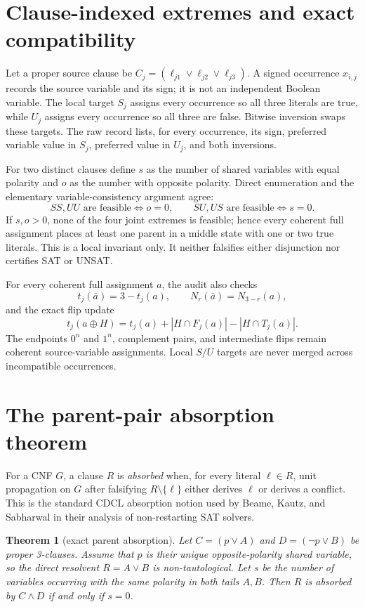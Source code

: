 \documentclass[11pt]{article}
\newtheorem{theorem}{Theorem}
\begin{document}
\section{Clause-indexed extremes and exact compatibility}
Let a proper source clause be $C_j=(\ell_{j1}\vee\ell_{j2}\vee\ell_{j3})$.  A signed occurrence $x_{i,j}$ records the source variable and its sign; it is not an independent Boolean variable.  The local target $S_j$ assigns every occurrence so all three literals are true, while $U_j$ assigns every occurrence so all three are false.  Bitwise inversion swaps these targets.  The raw record lists, for every occurrence, its sign, preferred variable value in $S_j$, preferred value in $U_j$, and both inversions.

For two distinct clauses define $s$ as the number of shared variables with equal polarity and $o$ as the number with opposite polarity.  Direct enumeration and the elementary variable-consistency argument agree:
\[
 SS,UU\text{ are feasible}\iff o=0,
 \qquad
 SU,US\text{ are feasible}\iff s=0.
\]
If $s,o>0$, none of the four joint extremes is feasible; hence every coherent full assignment places at least one parent in a middle state with one or two true literals.  This is a local invariant only.  It neither falsifies either disjunction nor certifies SAT or UNSAT.

For every coherent full assignment $a$, the audit also checks
\[
 t_j(\bar a)=3-t_j(a),\qquad N_r(\bar a)=N_{3-r}(a),
\]
and the exact flip update
\[
 t_j(a\oplus H)=t_j(a)+|H\cap F_j(a)|-|H\cap T_j(a)|.
\]
The endpoints $0^n$ and $1^n$, complement pairs, and intermediate flips remain coherent source-variable assignments.  Local $S/U$ targets are never merged across incompatible occurrences.

\section{The parent-pair absorption theorem}
For a CNF $G$, a clause $R$ is \emph{absorbed} when, for every literal $\ell\in R$, unit propagation on $G$ after falsifying $R\setminus\{\ell\}$ either derives $\ell$ or derives a conflict.  This is the standard CDCL absorption notion used by Beame, Kautz, and Sabharwal in their analysis of non-restarting SAT solvers.

\begin{theorem}[exact parent absorption]
Let $C=(p\vee A)$ and $D=(\neg p\vee B)$ be proper 3-clauses.  Assume that $p$ is their unique opposite-polarity shared variable, so the direct resolvent $R=A\vee B$ is non-tautological.  Let $s$ be the number of variables occurring with the same polarity in both tails $A,B$.  Then $R$ is absorbed by $C\wedge D$ if and only if $s=0$.
\end{theorem}
\end{document}
